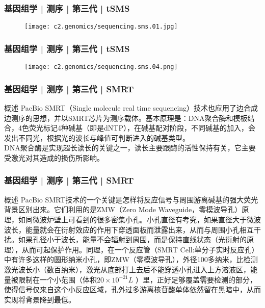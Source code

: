 \begin{frame}
  \frametitle{基因组学 | 测序 | 第三代 | tSMS}
  \begin{figure}
    \centering
    \texttt{[image: c2.genomics/sequencing.sms.01.jpg]}
  \end{figure}
\end{frame}

\begin{frame}
  \frametitle{基因组学 | 测序 | 第三代 | tSMS}
  \begin{figure}
    \centering
    \texttt{[image: c2.genomics/sequencing.sms.04.png]}
  \end{figure}
\end{frame}

\begin{frame}
  \frametitle{基因组学 | 测序 | 第三代 | SMRT}
  \begin{block}{概述}
PacBio SMRT（Single molecule real time sequencing）技术也应用了边合成边测序的思想，并以SMRT芯片为测序载体。基本原理是：DNA聚合酶和模板结合，4色荧光标记4种碱基（即是dNTP），在碱基配对阶段，不同碱基的加入，会发出不同光，根据光的波长与峰值可判断进入的碱基类型。\\
\vspace{1em}
DNA聚合酶是实现超长读长的关键之一，读长主要跟酶的活性保持有关，它主要受激光对其造成的损伤所影响。
  \end{block}
\end{frame}

\begin{frame}
  \frametitle{基因组学 | 测序 | 第三代 | SMRT}
  \begin{block}{概述}
    PacBio SMRT技术的一个关键是怎样将反应信号与周围游离碱基的强大荧光背景区别出来。它们利用的是ZMW（Zero Mode Waveguide，零模波导孔）原理，如同微波炉壁上可看到的很多密集小孔。小孔直径有考究，如果直径大于微波波长，能量就会在衍射效应的作用下穿透面板而泄露出来，从而与周围小孔相互干扰。如果孔径小于波长，能量不会辐射到周围，而是保持直线状态（光衍射的原理），从而可起保护作用。同理，在一个反应管（SMRT Cell:单分子实时反应孔）中有许多这样的圆形纳米小孔，即ZMW（零模波导孔），外径100多纳米，比检测激光波长小（数百纳米），激光从底部打上去后不能穿透小孔进入上方溶液区，能量被限制在一个小范围（体积$20 \times 10^{-21}L$ ）里，正好足够覆盖需要检测的部分，使得信号仅来自这个小反应区域，孔外过多游离核苷酸单体依然留在黑暗中，从而实现将背景降到最低。
  \end{block}
\end{frame}

